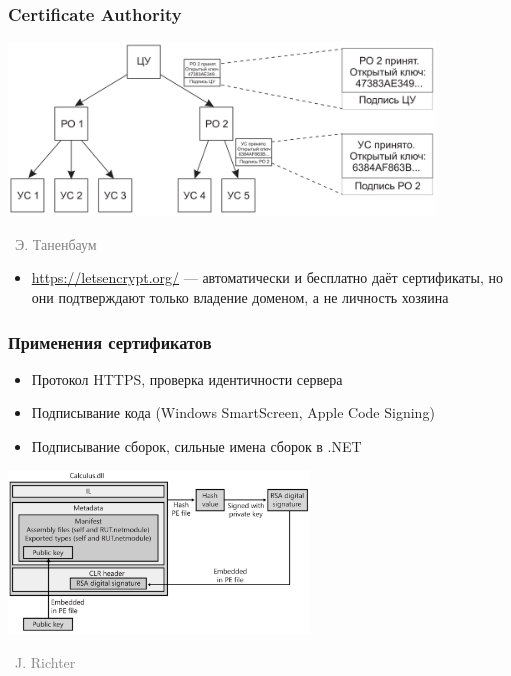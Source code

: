 \documentclass[xetex,mathserif,serif]{beamer}
\newcommand{\attribution}[1] {
\vspace{-5mm}\begin{flushright}\begin{scriptsize}\textcolor{gray}{\textcopyright\, #1}\end{scriptsize}\end{flushright}
}
\begin{document}
    \begin{frame}
        \frametitle{Certificate Authority}
        \begin{center}
            \includegraphics[width=0.85\textwidth]{certHierarchy.png}
            \attribution{Э. Таненбаум}
        \end{center}
        \begin{itemize}
            \item \url{https://letsencrypt.org/} --- автоматически и бесплатно даёт сертификаты, но они подтверждают только владение доменом, а не личность хозяина
        \end{itemize}
    \end{frame}

    \begin{frame}
        \frametitle{Применения сертификатов}
        \begin{itemize}
            \item Протокол HTTPS, проверка идентичности сервера
            \item Подписывание кода (Windows SmartScreen, Apple Code Signing)
            \item Подписывание сборок, сильные имена сборок в .NET
        \end{itemize}
        \begin{center}
            \includegraphics[width=0.6\textwidth]{dotNetCodeSigning.png}
            \attribution{J. Richter}
        \end{center}
    \end{frame}
\end{document}
